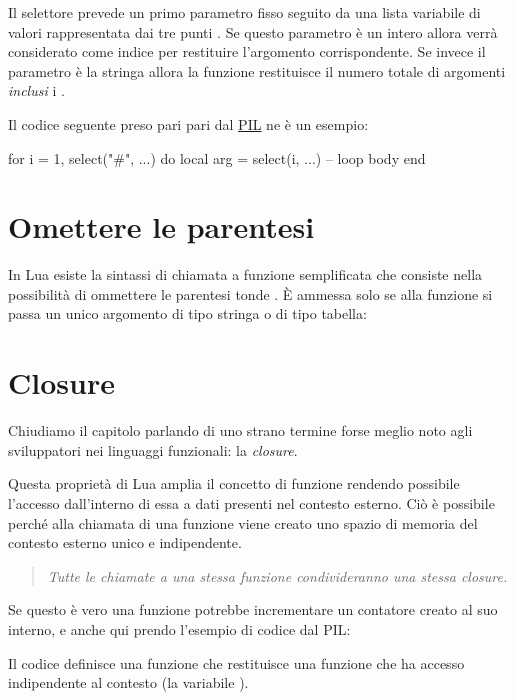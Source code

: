 Il selettore prevede un primo parametro fisso seguito da una lista variabile di
valori rappresentata dai tre punti . Se questo parametro è un intero
allora verrà considerato come indice per restituire l'argomento corrispondente.
Se invece il parametro è la stringa \key{\#} allora la funzione restituisce il
numero totale di argomenti \emph{inclusi} i .

Il codice seguente preso pari pari dal \href{http://www.lua.org/pil/}{PIL} ne è
un esempio:
\begin{lines}
for i = 1, select("#", ...) do
    local arg = select(i, ...)
    -- loop body
end
\end{lines}


\section{Omettere le parentesi}

In Lua esiste la sintassi di chiamata a funzione semplificata che consiste nella
possibilità di ommettere le parentesi tonde \key{()}\luas{()}. È ammessa solo se
alla funzione si passa un unico argomento di tipo stringa o di tipo tabella:


\section{Closure}
\label{iiSecClosure}

Chiudiamo il capitolo parlando di uno strano termine forse meglio noto agli
sviluppatori nei linguaggi funzionali: la \emph{closure}.

Questa proprietà di Lua amplia il concetto di funzione rendendo possibile
l'accesso dall'interno di essa a dati presenti nel contesto esterno. Ciò è
possibile perché alla chiamata di una funzione viene creato uno spazio di
memoria del contesto esterno unico e indipendente.

\begin{quote}
\emph{%
Tutte le chiamate a una stessa funzione condivideranno una stessa closure.%
}
\end{quote}

Se questo è vero una funzione potrebbe incrementare un contatore creato al suo
interno, e anche qui prendo l'esempio di codice dal PIL:

Il codice definisce una funzione  che restituisce una
funzione che ha accesso indipendente al contesto (la variabile ).

